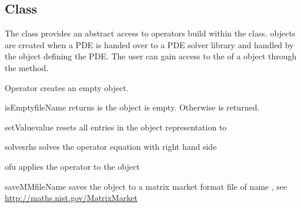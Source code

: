 \subsection{\Operator Class}
The \Operator class provides an abstract access to operators build
within the \LinearPDE class. \Operator objects are created 
when a PDE is handed over to a PDE solver library and handled
by the \LinearPDE object defining the PDE. The user can gain access
to the \Operator of a \LinearPDE object through the 
method.

\begin{classdesc}{Operator}{}
creates an empty \Operator object.
\end{classdesc}

\begin{methoddesc}[Operator]{isEmpty}{fileName}
returns \True is the object is empty. Otherwise \True is returned.
\end{methoddesc}

\begin{methoddesc}[Operator]{setValue}{value}
resets all entries in the object representation to 
\end{methoddesc}

\begin{methoddesc}[Operator]{solves}{rhs}
solves the operator equation with right hand side 
\end{methoddesc}

\begin{methoddesc}[Operator]{of}{u}
applies the operator to the \Data object 
\end{methoddesc}

\begin{methoddesc}[Operator]{saveMM}{fileName}
saves the object to a matrix market format file of name
, see
\url{http://maths.nist.gov/MatrixMarket}
\end{methoddesc}

